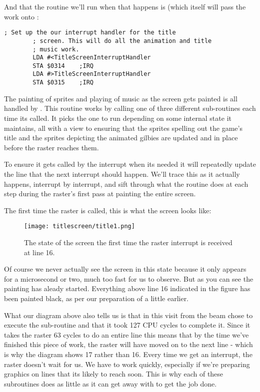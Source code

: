 And that the routine we'll run when that happens is  (which itself will pass
the work onto :

\begin{lstlisting}[caption=In \icode{InitializeSpritesAndInterruptsForTitleScreen}]
        ; Set up the our interrupt handler for the title
        ; screen. This will do all the animation and title
        ; music work.
        LDA #<TitleScreenInterruptHandler
        STA $0314    ;IRQ
        LDA #>TitleScreenInterruptHandler
        STA $0315    ;IRQ
\end{lstlisting}

The painting of sprites and playing of music as the screen gets painted is all handled by .
This routine works by calling one of three different sub-routines each time its called. It picks the one to run
depending on some internal state it maintains, all with a view to ensuring that the sprites spelling out the game's
title and the sprites depicting the animated gilbies are updated and in place before the raster reaches them.

To ensure it gets called by the interrupt when its needed it will repeatedly update the line that the next interrupt
should happen. We'll trace this as it actually happens, interrupt by interrupt, and sift through what the routine
does at each step during the raster's first pass at painting the entire screen.

The first time the raster is called, this is what the screen looks like:

\begin{figure}[H]
    \centering
      \texttt{[image: titlescreen/title1.png]}%
\caption{The state of the screen the first time the raster interrupt is received at line 16.}
\end{figure}

Of course we never actually see the screen in this state because it only appears for a microsecond or two, much too
fast for us to observe. But as you can see the painting has aleady started. Everything above line 16 indicated in 
the figure has been painted black, as per our preparation of  a little earlier.

What our diagram above also tells us is that in this visit from the beam  chose to execute
the sub-routine  and that it took 127 CPU cycles to complete it. Since it takes the
raster 63 cycles to do an entire line this means that by the time we've finished this piece of work, the raster will have
moved on to the next line - which is why the diagram shows 17 rather than 16. Every time we get an interrupt, the 
raster doesn't wait for us. We have to work quickly, especially if we're preparing graphics on lines that its likely
to reach soon. This is why each of these subroutines does as little as it can get away with to get the job done.

